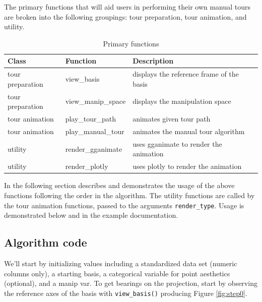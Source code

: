 The primary functions that will aid users in performing their own manual
tours are broken into the following groupings: tour preparation, tour
animation, and utility.

\begin{Schunk}
\begin{table}[t]

\caption{\label{tab:functionsTable}Primary functions}
\centering
\begin{tabular}{lll}
\toprule
Class & Function & Description\\
\midrule
tour preparation & view\_basis & displays the reference frame of the basis\\
tour preparation & view\_manip\_space & displays the manipulation space\\
tour animation & play\_tour\_path & animates given tour path\\
tour animation & play\_manual\_tour & animates the manual tour algorithm\\
utility & render\_gganimate & uses gganimate to render the animation\\
\addlinespace
utility & render\_plotly & uses plotly to render the animation\\
\bottomrule
\end{tabular}
\end{table}

\end{Schunk}

In the following section describes and demonstrates the usage of the
above functions following the order in the algorithm. The utility
functions are called by the tour animation functions, passed to the
arguments \texttt{render\_type}. Usage is demonstrated below and in the
example documentation.

\hypertarget{algorithm-code}{%
\subsection{Algorithm code}\label{algorithm-code}}

We'll start by initializing values including a standardized data set
(numeric columns only), a starting basis, a categorical variable for
point aesthetics (optional), and a manip var. To get bearings on the
projection, start by observing the reference axes of the basis with
\texttt{view\_basis()} producing Figure \ref{fig:step0}.

\begin{Schunk}
\end{Schunk}

